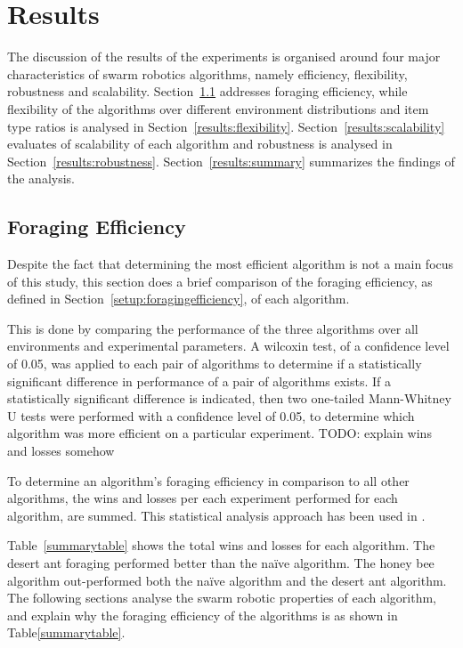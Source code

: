 \chapter{Results}
\label{chap:results}

The discussion of the results of the experiments is organised around four major characteristics of swarm robotics algorithms, namely efficiency, flexibility, robustness and scalability. Section~\ref{results:efficiency} addresses foraging efficiency, while flexibility of the algorithms over different environment distributions and item type ratios is analysed in Section~\ref{results:flexibility}. Section~\ref{results:scalability} evaluates of scalability of each algorithm and robustness is analysed in Section~\ref{results:robustness}. Section~\ref{results:summary} summarizes the findings of the analysis.

\section{Foraging Efficiency}
\label{results:efficiency}


Despite the fact that determining the most efficient algorithm is not a main focus of this study, this section does a brief comparison of the foraging efficiency, as defined in Section~\ref{setup:foragingefficiency}, of each algorithm. 

This is done by comparing the performance of the three algorithms over all environments and experimental parameters. A wilcoxin test, of a confidence level of 0.05, was applied to each pair of algorithms to determine if a statistically significant difference in performance of a pair of algorithms exists. If a statistically significant difference is indicated, then two one-tailed Mann-Whitney U tests were performed with a confidence level of 0.05, to determine which algorithm was more efficient on a particular experiment. TODO: explain wins and losses somehow

To determine an algorithm's foraging efficiency in comparison to all other algorithms, the wins and losses per each experiment performed for each algorithm, are summed. This statistical analysis approach has been used in \cite{helbig2013performance}.

Table~\ref{summarytable} shows the total wins and losses for each algorithm. The desert ant foraging performed better than the na\"ive algorithm. The honey bee algorithm out-performed both the na\"ive algorithm and the desert ant algorithm. The following sections analyse the swarm robotic properties of each algorithm, and explain why the foraging efficiency of the algorithms is as shown in Table\ref{summarytable}.



